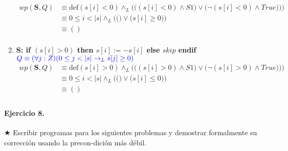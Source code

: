 \documentclass{article}
\begin{document}
\begin{enumerate}[label=\alph*)]
   		\begin{align*}
   			wp(\textbf{S},Q)&\equiv \textrm{def}(s[i]<0)\wedge_L 
   				\Bigg(\Big((s[i]<0)\wedge S1\Big) \vee\Big(\neg (s[i]<0)\wedge True)\Big)\Bigg)\\
   							&\equiv 0\leq i<|s|\wedge_L\Bigg(\Big(\Big) \vee \Big(s[i]\geq 0
   							\Big)\Bigg)\\
   							&\equiv () \\
   		\end{align*}
   	\item
   		\textbf{S: if $(s[i]>0)$ then $s[i]:= -s[i] $ else $skip$ endif}\\
   		\hspace*{24mm}$\color{blue}Q \equiv (\forall j :Z)(0 \leq j < |s| 
   			\rightarrow_L s[j] \geq 0)$\\
   		\begin{align*}
   			wp(\textbf{S},Q)&\equiv \textrm{def}(s[i]>0)\wedge_L 
   				\Bigg(\Big((s[i]>0)\wedge S1\Big) \vee\Big(\neg (s[i]>0)\wedge True)\Big)\Bigg)\\
   							&\equiv 0\leq i<|s|\wedge_L\Bigg(\Big(\Big) \vee \Big(s[i]\leq 0
   							\Big)\Bigg)\\
   							&\equiv () \\
   		\end{align*}	
\end{enumerate}
                                                          
\paragraph{Ejercicio 8.} $\bigstar$ Escribir programas para los siguientes problemas y demostrar 
formalmente su corrección usando la precon-dición más débil.
\end{document}
